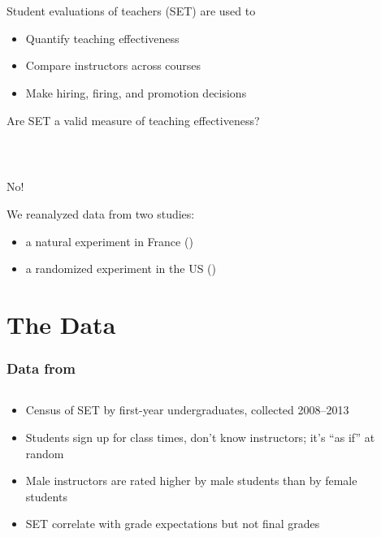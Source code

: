 \documentclass{beamer}
\begin{document}
\frame
{
  \frametitle{ ~}
 \begin{center}
 \Large{ Student evaluations of teachers (SET) are used to} \\
  \begin{itemize}
  \item Quantify teaching effectiveness
  \item Compare instructors across courses
  \item Make hiring, firing, and promotion decisions  
  \end{itemize}
  \vfill
Are SET a valid measure of teaching effectiveness?
\end{center}
}

\frame
{
  \frametitle{ ~}
  \begin{center}
  \Huge{No!}
  \end{center}

\vfill
\Large


We reanalyzed data from two studies: 
\begin{itemize}
\item a natural experiment in France (\cite{Boring2015})
\item a randomized experiment in the US (\cite{MacNell2014})
\end{itemize}


}

\section{The Data}
\frame
{
  \frametitle{Data from \cite{Boring2015}}
\begin{columns}[T]
\begin{column}{.5\textwidth}
\begin{center}
\begin{itemize}
\item Census of SET by first-year undergraduates, collected 2008--2013
\item Students sign up for class times, don't know instructors; it's ``as if'' at random
\item Male instructors are rated higher by male students than by female students
\item SET correlate with grade expectations but not final grades
\end{itemize}
\end{center}
\end{column}
\begin{column}{.5\textwidth}
\end{column}
\end{columns}

}
\end{document}
